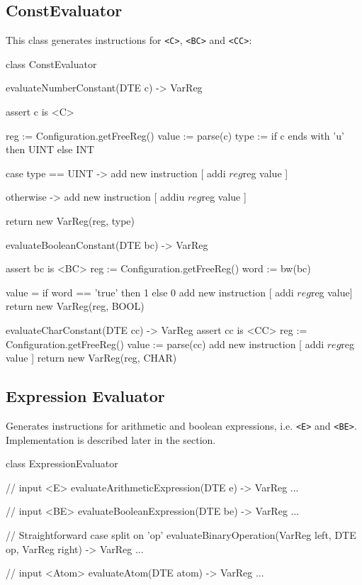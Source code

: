 \subsection{ConstEvaluator}
This class generates instructions for \verb+<C>+, \verb+<BC>+ and \verb+<CC>+:
\begin{codeblock}
class ConstEvaluator {
    evaluateNumberConstant(DTE c) -> VarReg {
        assert c is <C>

        reg := Configuration.getFreeReg()
        value := parse(c)
        type := if c ends with 'u' then UINT else INT

        case type == UINT -> {
            add new instruction [ addi $reg $reg value ]
        }

        otherwise -> {
            add new instruction [ addiu $reg $reg value ]
        }

        return new VarReg(reg, type)
    }

    evaluateBooleanConstant(DTE bc) -> VarReg {
        assert bc is <BC>
        reg := Configuration.getFreeReg()
        word := bw(bc)

        value = if word == 'true' then 1 else 0
        add new instruction [ addi $reg $reg value]
        return new VarReg(reg, BOOL)
    }

    evaluateCharConstant(DTE cc) -> VarReg {
        assert cc is <CC>
        reg := Configuration.getFreeReg()
        value := parse(cc)
        add new instruction [ addi $reg $reg value ]
        return new VarReg(reg, CHAR)
    }
}
\end{codeblock}
\subsection{Expression Evaluator}
Generates instructions for arithmetic and boolean expressions, i.e. \verb+<E>+ and \verb+<BE>+.
Implementation is described later in the section.
\begin{codeblock}[ExpressionEvaluator]
class ExpressionEvaluator {
    // input <E>
    evaluateArithmeticExpression(DTE e) -> VarReg { ... }

    // input <BE>
    evaluateBooleanExpression(DTE be) -> VarReg { ... }

    // Straightforward case split on 'op'
    evaluateBinaryOperation(VarReg left, DTE op, VarReg right) -> VarReg { ... }

    // input <Atom>
    evaluateAtom(DTE atom) -> VarReg { ... }
}
\end{codeblock}

